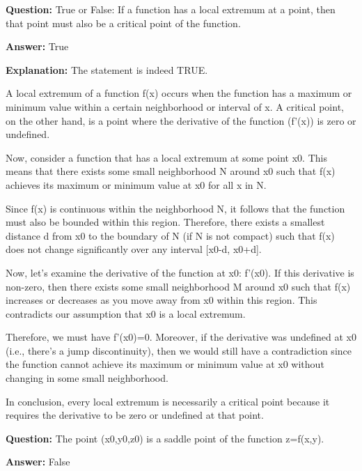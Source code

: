 \documentclass{article}
\begin{document}
                \vspace{0.5cm} 
        
            
                \textbf {Question:} True or False: If a function has a local extremum at a point, then that point must also be a critical point of the function.
                
                \textbf{Answer:} True

                \textbf{Explanation:} The statement is indeed TRUE.

A local extremum of a function f(x) occurs when the function has a maximum or minimum value within a certain neighborhood or interval of x. A critical point, on the other hand, is a point where the derivative of the function (f'(x)) is zero or undefined.

Now, consider a function that has a local extremum at some point x0. This means that there exists some small neighborhood N around x0 such that f(x) achieves its maximum or minimum value at x0 for all x in N.

Since f(x) is continuous within the neighborhood N, it follows that the function must also be bounded within this region. Therefore, there exists a smallest distance d from x0 to the boundary of N (if N is not compact) such that f(x) does not change significantly over any interval [x0-d, x0+d].

Now, let's examine the derivative of the function at x0: f'(x0). If this derivative is non-zero, then there exists some small neighborhood M around x0 such that f(x) increases or decreases as you move away from x0 within this region. This contradicts our assumption that x0 is a local extremum.

Therefore, we must have f'(x0)=0. Moreover, if the derivative was undefined at x0 (i.e., there's a jump discontinuity), then we would still have a contradiction since the function cannot achieve its maximum or minimum value at x0 without changing in some small neighborhood.

In conclusion, every local extremum is necessarily a critical point because it requires the derivative to be zero or undefined at that point.
                
                \vspace{0.5cm} 
        
            
                \textbf {Question:} The point (x0,y0,z0) is a saddle point of the function z=f(x,y).
                
                \textbf{Answer:} False
\end{document}
